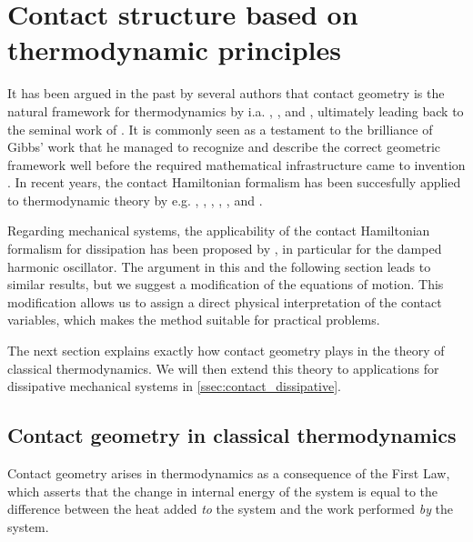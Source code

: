 \section{Contact structure based on thermodynamic principles}
\label{sec:thermodynamics}
It has been argued in the past by several authors that contact geometry is the natural framework for thermodynamics by i.a. \citet{Arnold1991,Arnold1989a,Arnold1989,Arnold1989b}, \citet{Bamberg1988}, \citet{Burke1985} and \citet{Hermann1973}, ultimately leading back to the seminal work of \citet{Gibbs1873}. It is commonly seen as a testament to the brilliance of Gibbs' work that he managed to recognize and describe the correct geometric framework well before the required mathematical infrastructure came to invention \cite{Wightman1979}. In recent years, the contact Hamiltonian formalism has been succesfully applied to thermodynamic theory by e.g. \citet{Mrugala1991,Mrugala2000,Mrugala1984,Mrugala1985,Mrugala1993,Mrugala1996}, \citet{Balian2001}, \citet{VanderSchaft2021a,VanderSchaft2018}, \citet{Maschke2018}, \citet{Bravetti2015}, and \citet{Simoes2020}. 

Regarding mechanical systems, the applicability of the contact Hamiltonian formalism for dissipation has been proposed by \citet{Bravetti2017}, in particular for the damped harmonic oscillator. The argument in this and the following section leads to similar results, but we suggest a modification of the equations of motion. This modification allows us to assign a direct physical interpretation of the contact variables, which makes the method suitable for practical problems.

The next section explains exactly how contact geometry plays in the theory of classical thermodynamics. We will then extend this theory to applications for dissipative mechanical systems in \cref{ssec:contact_dissipative}.

\subsection{Contact geometry in classical thermodynamics} 
Contact geometry arises in thermodynamics as a consequence of the First Law, which asserts that the change in internal energy of the system is equal to the difference between the heat added \emph{to} the system and the work performed \emph{by} the system. 

